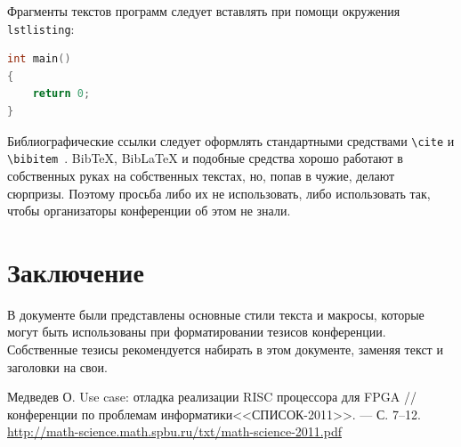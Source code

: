 \documentclass{math-mech-sci}
\begin{document}
Фрагменты текстов программ следует вставлять при помощи окружения
\texttt{lstlisting}:

\begin{lstlisting}[language=C,label=lst:code1]
int main()
{
    return 0;
}
\end{lstlisting}

Библиографические ссылки следует оформлять стандартными средствами
\texttt{\textbackslash{}cite} и
\texttt{\textbackslash{}bibitem}~\cite{medvedev2011}. BibTeX, BibLaTeX
и подобные средства хорошо работают в собственных руках на собственных
текстах, но, попав в чужие, делают сюрпризы.  Поэтому просьба либо их
не использовать, либо использовать так, чтобы организаторы конференции
об этом не знали.

\section{Заключение}

В документе были представлены основные стили текста и макросы, которые
могут быть использованы при форматировании тезисов конференции.
Собственные тезисы рекомендуется набирать в этом документе, заменяя
текст и заголовки на свои.

\begin{thebibliography}{8}

 Медведев О. Use case: отладка реализации RISC
  процессора для FPGA // %
  конференции по проблемам информатики<<СПИСОК-2011>>. --- %
  С. 7--12.
  \href{http://math-science.math.spbu.ru/txt/math-science-2011.pdf}{http://math-science.math.spbu.ru/txt/math-science-2011.pdf}

\end{thebibliography}
\end{document}
